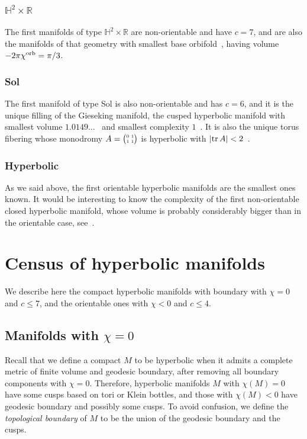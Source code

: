 \documentclass[10pt]{article}      %
\makeatletter
\newcommand{\matR} {\ensuremath {\mathbb{R}}}
\newcommand{\matH} {\ensuremath {\mathbb{H}}}
\newcommand{\chiorb}{\chi^{\rm orb}}
\newcommand{\matr} [4] 
{\left(\tiny{\begin{array}{@{}c@{\ }c@{}} #1 & #2 \\ #3 & #4 \\ \end{array}} \right)}
\newcommand{\tr} {{\rm tr\,}}
\makeatother
\begin{document}
\subsubsection{$\matH^2\times\matR$}
The first manifolds of type $\matH^2\times\matR$ are non-orientable and have $c=7$, and are
also the manifolds of that geometry with smallest base orbifold~\cite{AmMa2}, 
having volume 
$-2\pi\chiorb = \pi/3$. 

\subsubsection{Sol}
The first manifold of type Sol 
is also non-orientable and has $c=6$,
and it is the unique filling of the Gieseking manifold, the cusped 
hyperbolic manifold with smallest
volume $1.0149\ldots$~\cite{Ad} and smallest 
complexity $1$~\cite{CaHiWe}.
It is also the unique torus
fibering whose monodromy $A=\matr 0111$ is hyperbolic with $|\tr A|<2$~\cite{AmMa2}.

\subsubsection{Hyperbolic}
As we said above, the first orientable 
hyperbolic manifolds are the smallest ones known. It would be
interesting to know the complexity of the first non-orientable closed hyperbolic manifold,
whose volume is probably considerably bigger than in the orientable case, see~\cite{HoWe}.

\section{Census of hyperbolic manifolds} \label{hyperbolic:section}
We describe here the compact hyperbolic manifolds with boundary with $\chi=0$ and $c\leqslant 7$,
and the orientable ones with $\chi<0$ and $c\leqslant 4$.

\subsection{Manifolds with $\chi = 0$}
Recall that we define a compact $M$ to be
hyperbolic when it admits a complete metric
of finite volume and geodesic boundary, after removing 
all boundary components with $\chi = 0$.
Therefore, hyperbolic manifolds $M$ with $\chi(M)=0$ have some cusps based on tori or Klein
bottles, and those with $\chi(M)<0$ have geodesic boundary and possibly some cusps.
To avoid confusion, we define the \emph{topological boundary} of $M$ 
to be the union of the geodesic boundary and the cusps.
\end{document}
